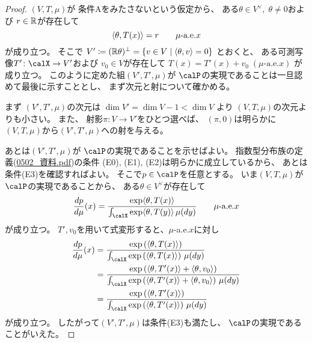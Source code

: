 \documentclass[report]{jlreq}
\begin{document}
\begin{proof}
    $(V, T, \mu)$が
    条件Aをみたさないという仮定から、
    ある$\theta \in V^\vee, \; \theta \neq 0$および
    $r \in \mathbb{R}$が存在して
    \begin{equation}
        \locallabel{eq:costant-pairing}
        \langle \theta, T(x) \rangle
            = r
            \qquad
            \text{$\mu$-a.e.$x$}
    \end{equation}
    が成り立つ。
    そこで
    $V' \coloneqq (\mathbb{R}\theta)^\perp
        = \{ v \in V \mid \langle \theta, v \rangle = 0 \}$
    とおくと、
    ある可測写像$T' \colon \calX \to V'$および
    $v_0 \in V$が存在して
    $T(x) = T'(x) + v_0 \; (\text{$\mu$-a.e.$x$})$
    が成り立つ。
    このように定めた組$(V', T', \mu)$が
    $\calP$の実現であることは一旦認めて最後に示すこととし、
    まず次元と射について確かめる。

    まず
    $(V', T', \mu)$の次元は
    $\dim V' = \dim V - 1 < \dim V$
    より
    $(V, T, \mu)$の次元よりも小さい。
    また、
    射影$\pi \colon V \to V'$をひとつ選べば、
    $(\pi, 0)$は明らかに
    $(V, T, \mu)$から$(V', T', \mu)$への射を与える。

    あとは$(V', T', \mu)$が
    $\calP$の実現であることを示せばよい。
    指数型分布族の定義(\url{0502_資料.pdf})の条件
    (E0), (E1), (E2)は明らかに成立しているから、
    あとは条件(E3)を確認すればよい。
    そこで$p \in \calP$を任意とする。
    いま$(V, T, \mu)$が$\calP$の実現であることから、
    ある$\theta \in V^\vee$が存在して
    \begin{equation}
        \dd[p]{\mu}(x)
            = \frac{
                \exp\langle \theta, T(x) \rangle
            }{
                \int_{\calX} \exp\langle \theta, T(y) \rangle \, \mu(dy)
            }
            \qquad
            \text{$\mu$-a.e.$x$}
    \end{equation}
    が成り立つ。
    $T', v_0$を用いて式変形すると、$\mu$-a.e.$x$に対し
    \begin{alignat}{1}
        \dd[p]{\mu}(x)
            &= \frac{
                \exp\myparen{
                    \langle \theta, T(x) \rangle
                }
            }{
                \int_{\calX} \exp\myparen{
                    \langle \theta, T(x) \rangle
                } \, \mu(dy)
            } \\
            &= \frac{
                \exp\myparen{
                    \langle \theta, T'(x) \rangle
                    + \langle \theta, v_0 \rangle
                }
            }{
                \int_{\calX} \exp\myparen{
                    \langle \theta, T'(x) \rangle
                    + \langle \theta, v_0 \rangle
                } \, \mu(dy)
            } \\
            &= \frac{
                \exp\myparen{
                    \langle \theta, T'(x) \rangle
                }
            }{
                \int_{\calX} \exp\myparen{
                    \langle \theta, T'(x) \rangle
                } \, \mu(dy)
            }
    \end{alignat}
    が成り立つ。
    したがって$(V', T', \mu)$は条件(E3)も満たし、
    $\calP$の実現であることがいえた。
\end{proof}
\end{document}
